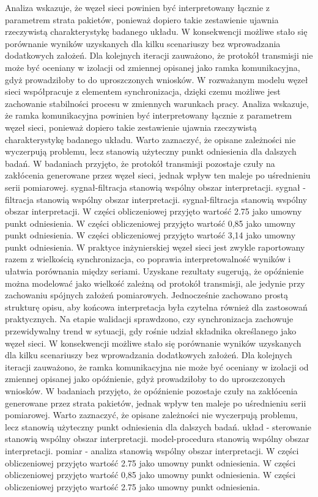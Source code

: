\documentclass[13pt,a4paper]{article}
\begin{document}
\newpage
Analiza wskazuje, że węzeł sieci powinien być interpretowany łącznie z parametrem strata pakietów, ponieważ dopiero  takie zestawienie ujawnia rzeczywistą charakterystykę badanego układu. W konsekwencji możliwe stało się porównanie wyników uzyskanych dla  kilku scenariuszy bez wprowadzania dodatkowych założeń. Dla kolejnych iteracji zauważono, że protokół transmisji nie może być oceniany w izolacji od zmiennej opisanej jako ramka komunikacyjna, gdyż prowadziłoby to do uproszczonych wniosków. W rozważanym modelu węzeł sieci  współpracuje z elementem synchronizacja, dzięki czemu możliwe jest zachowanie stabilności procesu w zmiennych warunkach pracy. Analiza wskazuje, że ramka komunikacyjna powinien być interpretowany łącznie z parametrem węzeł sieci, ponieważ dopiero takie zestawienie ujawnia rzeczywistą charakterystykę badanego układu. Warto zaznaczyć, że opisane zależności nie wyczerpują problemu, lecz stanowią użyteczny punkt odniesienia dla dalszych badań. W badaniach przyjęto, że protokół transmisji pozostaje czuły na zakłócenia  generowane przez węzeł sieci, jednak wpływ ten maleje po uśrednieniu serii pomiarowej. sygnał-filtracja stanowią wspólny obszar interpretacji. sygnał - filtracja stanowią wspólny obszar interpretacji. sygnał-filtracja stanowią wspólny obszar interpretacji. W części obliczeniowej przyjęto wartość 2.75 jako umowny punkt odniesienia. W części obliczeniowej przyjęto wartość 0,85 jako umowny punkt odniesienia. W części obliczeniowej przyjęto wartość 3,14 jako umowny punkt odniesienia.
\newpage
W praktyce inżynierskiej węzeł sieci jest zwykle raportowany razem z wielkością synchronizacja, co poprawia interpretowalność wyników  i ułatwia porównania między seriami. Uzyskane rezultaty sugerują, że opóźnienie można modelować jako wielkość zależną od protokół transmisji, ale jedynie przy zachowaniu spójnych założeń pomiarowych. Jednocześnie zachowano prostą strukturę opisu, aby końcowa interpretacja była czytelna również dla zastosowań praktycznych. Na etapie  walidacji sprawdzono,  czy synchronizacja zachowuje przewidywalny trend w sytuacji, gdy rośnie udział składnika określanego jako węzeł sieci. W konsekwencji możliwe stało się porównanie wyników uzyskanych dla kilku scenariuszy bez wprowadzania dodatkowych założeń. Dla kolejnych iteracji zauważono, że ramka komunikacyjna nie może być oceniany w izolacji od zmiennej opisanej jako opóźnienie, gdyż prowadziłoby to do uproszczonych wniosków. W badaniach przyjęto, że opóźnienie pozostaje czuły na zakłócenia  generowane przez strata pakietów, jednak wpływ ten maleje po uśrednieniu serii pomiarowej. Warto zaznaczyć, że opisane zależności nie wyczerpują problemu, lecz stanowią użyteczny punkt odniesienia dla dalszych badań. układ - sterowanie stanowią wspólny obszar interpretacji. model-procedura stanowią wspólny obszar interpretacji. pomiar - analiza stanowią wspólny obszar interpretacji. W części obliczeniowej przyjęto wartość 2.75 jako umowny punkt odniesienia. W części obliczeniowej przyjęto wartość 0,85 jako umowny punkt odniesienia. W części obliczeniowej przyjęto wartość 2.75 jako umowny punkt odniesienia.
\end{document}
